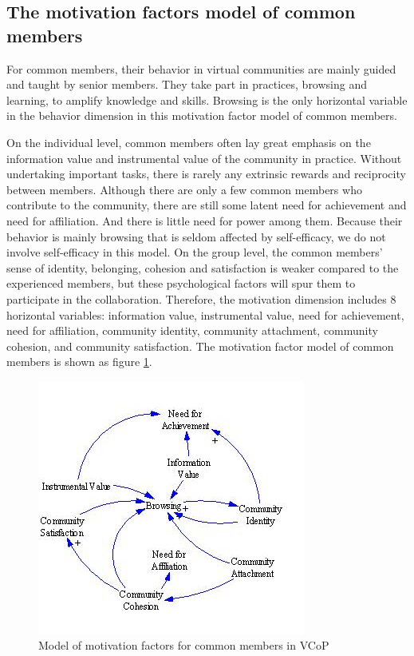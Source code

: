 \documentclass{elsarticle}
\begin{document}
\subsection{The motivation factors model of common members}
\label{sec:motiv-fact-model-1}

For common members, their behavior in virtual communities are mainly
guided and taught by senior members. They take part in practices,
browsing and learning, to amplify knowledge and skills. Browsing is the only horizontal variable in the behavior dimension in this motivation factor model of common members. 


On the individual level, common members often lay great emphasis on
the information value and instrumental value of the community in
practice. Without undertaking important tasks, there is rarely any extrinsic
rewards and reciprocity between members. Although there are only a few
common members who contribute  to the community, there are still some
latent need for achievement and need for affiliation. And there is
little need for power among them. Because their behavior is mainly
browsing that is seldom affected by self-efficacy, we do not involve self-efficacy in this model. On the group
level, the common members’ sense of identity, belonging, cohesion and
satisfaction is weaker compared to the experienced members, but these
psychological factors will spur them to participate in the
collaboration. Therefore, the motivation dimension includes 8
horizontal variables: information value, instrumental value, need for
achievement, need for affiliation, community identity, community
attachment, community cohesion, and community satisfaction. The
motivation factor model of common members is shown as figure \ref{fig:common-member}.  
\begin{figure}[htpb]
  \centering
  \label{fig:common-member}
  \includegraphics{04}
  \caption{Model of motivation factors for common
    members in VCoP}
\end{figure}
\end{document}
